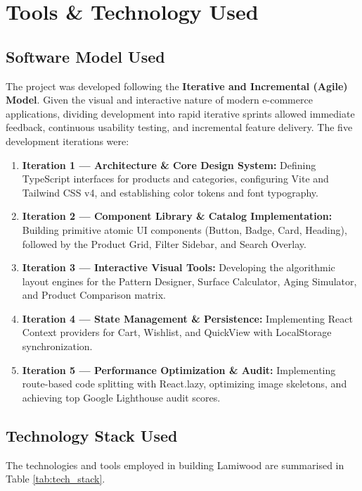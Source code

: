 \documentclass[12pt,a4paper]{report}
\begin{document}
\chapter{Tools \& Technology Used}

\section{Software Model Used}
The project was developed following the \textbf{Iterative and Incremental (Agile) Model}. Given the visual and interactive nature of modern e-commerce applications, dividing development into rapid iterative sprints allowed immediate feedback, continuous usability testing, and incremental feature delivery. The five development iterations were:
\begin{enumerate}
    \item \textbf{Iteration 1 --- Architecture \& Core Design System:} Defining TypeScript interfaces for products and categories, configuring Vite and Tailwind CSS v4, and establishing color tokens and font typography.
    \item \textbf{Iteration 2 --- Component Library \& Catalog Implementation:} Building primitive atomic UI components (Button, Badge, Card, Heading), followed by the Product Grid, Filter Sidebar, and Search Overlay.
    \item \textbf{Iteration 3 --- Interactive Visual Tools:} Developing the algorithmic layout engines for the Pattern Designer, Surface Calculator, Aging Simulator, and Product Comparison matrix.
    \item \textbf{Iteration 4 --- State Management \& Persistence:} Implementing React Context providers for Cart, Wishlist, and QuickView with LocalStorage synchronization.
    \item \textbf{Iteration 5 --- Performance Optimization \& Audit:} Implementing route-based code splitting with React.lazy, optimizing image skeletons, and achieving top Google Lighthouse audit scores.
\end{enumerate}

\section{Technology Stack Used}
The technologies and tools employed in building Lamiwood are summarised in Table \ref{tab:tech_stack}.
\end{document}
